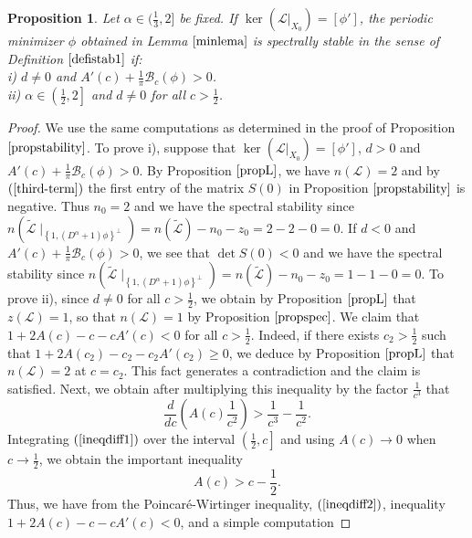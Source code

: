 \documentclass[12pt,reqno]{amsart}
\newcommand{\2}{L^2_{per}(0, T)}
\numberwithin{equation}{section}
\numberwithin{figure}{section}
\newtheorem{proposition}[theorem]{Proposition}
\begin{document}
\begin{proposition}\label{spectmin}
	Let $\alpha\in(\frac{1}{3},2]$ be fixed. If $\ker\left(\mathcal{L}|_{X_0}\right)=[\phi']$, the periodic minimizer $\phi$ obtained in Lemma $\ref{minlema}$ is spectrally stable in the sense of Definition $\ref{defistab1}$ if:\\
	i)  $d\neq0$ and $A'(c)+ \frac{1}{\pi}\mathcal{B}_c(\phi)>0$.\\
	ii) $\alpha\in\left(\frac{1}{2},2\right]$ and $d\neq0$ for all $c>\frac{1}{2}$.
	\end{proposition}
\begin{proof}
	We use the same computations as determined in the proof of Proposition $\ref{propstability}$. To prove i), suppose that $\ker(\mathcal{L}|_{X_0})=[\phi']$, $d>0$ and $A'(c)+ \frac{1}{\pi}\mathcal{B}_c(\phi)>0$. By Proposition $\ref{propL}$, we have $n(\mathcal{L})=2$ and by $(\ref{third-term})$ the first entry of the matrix $S(0)$ in Proposition $\ref{propstability}$ is negative. Thus $n_0=2$ and we have the spectral stability since $n (\mathcal{\tilde{L}}\mid_{\left\{1, (D^{\alpha}+1)\phi\right\}^{\bot}})  =  n(\mathcal{\tilde{L}}) - n_0 - z_0=2-2-0=0$. If $d<0$ and $A'(c)+ \frac{1}{\pi}\mathcal{B}_c(\phi)>0$, we see that $\det S(0)<0$ and we have the spectral stability since $n (\mathcal{\tilde{L}}\mid_{\left\{1, (D^{\alpha}+1)\phi\right\}^{\bot}})  =  n(\mathcal{\tilde{L}}) - n_0 - z_0=1-1-0=0$.  To prove ii), since $d\neq0$ for all $c>\frac{1}{2}$, we obtain by Proposition $\ref{propL}$ that $z(\mathcal{L})=1$, so that $n(\mathcal{L})=1$ by Proposition $\ref{propspec}$. We claim that  $1+2A(c)-c-cA'(c)<0$ for all $c>\frac{1}{2}$. Indeed, if there exists $c_2>\frac{1}{2}$ such that $1+2A(c_2)-c_2-c_2A'(c_2)\geq0$, we deduce by Proposition $\ref{propL}$ that $n(\mathcal{L})=2$ at $c=c_2$. This fact generates a contradiction and the claim is satisfied. Next, we obtain after multiplying this inequality by the factor $\frac{1}{c^3}$ that
	\begin{equation}\label{ineqdiff1}
	\frac{d}{dc}\left(A(c)\frac{1}{c^2}\right)>\frac{1}{c^3}-\frac{1}{c^2}.
	\end{equation}
	\indent Integrating $(\ref{ineqdiff1})$ over the interval $\left(\frac{1}{2},c\right]$ and using $A(c)\rightarrow 0$ when $c\rightarrow\frac{1}{2}$, we obtain the important inequality
	\begin{equation}\label{ineqdiff2}
	A(c)>c-\frac{1}{2}.
	\end{equation}
	Thus, we have from the Poincar\'e-Wirtinger inequality, $(\ref{ineqdiff2})$,  inequality $1+2A(c)-c-cA'(c)<0$, and a simple computation
	

\end{proof}
\end{document}
